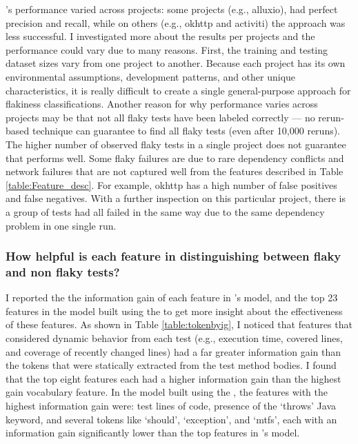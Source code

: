 \sysName's performance varied across projects: some projects (e.g., alluxio), had perfect precision and recall, while on others (e.g., okhttp and activiti) the approach was less successful. I investigated more about the results per projects and the performance could vary due to many reasons. First, the training and testing dataset sizes vary from one project to another. Because each project has its own environmental assumptions, development patterns, and other unique characteristics, it is really difficult to create a single general-purpose approach for flakiness classifications. Another reason for why performance varies across projects may be that not all flaky tests have been labeled correctly --- no rerun-based technique can guarantee to find all flaky tests (even after 10,000 reruns). The higher number of observed flaky tests in a single project does not guarantee that \sysName performs well.
Some flaky failures are due to rare dependency conflicts and network failures that are not captured well from the features described in Table \ref{table:Feature_desc}.
For example, okhttp has a high number of false positives and false negatives. With a further inspection on this particular project, there is a group of tests had all failed in the same way due to the same dependency problem in one single run.





\subsubsection{How helpful is each feature in distinguishing between flaky and non flaky tests?}
\label{FlakeFlaggerRQ4}

I reported the the information gain of each feature in \sysName's model, and the top 23 features in the model built using the \vocabName to get more insight about the effectiveness of these features. As shown in Table \ref{table:tokenbyig}, I noticed that features that considered dynamic behavior from each test (e.g., execution time, covered lines, and coverage of recently changed lines) had a far greater information gain than the tokens that were statically extracted from the test method bodies. I found that the top eight \sysName features each had a higher information gain than the highest gain vocabulary feature. In the model built using the \vocabName \cite{pinto2020vocabulary}, the features with the highest information gain were: test lines of code, presence of the `throws' Java keyword, and several tokens like `should', `exception', and `mtfs', each with an information gain significantly lower than the top features in \sysName's model.

